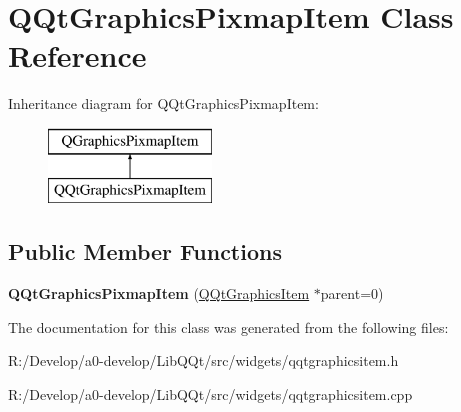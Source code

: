 \hypertarget{class_q_qt_graphics_pixmap_item}{}\section{Q\+Qt\+Graphics\+Pixmap\+Item Class Reference}
\label{class_q_qt_graphics_pixmap_item}
Inheritance diagram for Q\+Qt\+Graphics\+Pixmap\+Item\+:\begin{figure}[H]
\begin{center}
\leavevmode
\includegraphics[height=2.000000cm]{class_q_qt_graphics_pixmap_item}
\end{center}
\end{figure}
\subsection*{Public Member Functions}
\begin{DoxyCompactItemize}
\item 
\mbox{\label{class_q_qt_graphics_pixmap_item_a9958e7e3d2a49759b08baa8a60475c6e}} 
{\bfseries Q\+Qt\+Graphics\+Pixmap\+Item} (\mbox{\hyperlink{class_q_qt_graphics_item}{Q\+Qt\+Graphics\+Item}} $\ast$parent=0)
\end{DoxyCompactItemize}


The documentation for this class was generated from the following files\+:\begin{DoxyCompactItemize}
\item 
R\+:/\+Develop/a0-\/develop/\+Lib\+Q\+Qt/src/widgets/qqtgraphicsitem.\+h\item 
R\+:/\+Develop/a0-\/develop/\+Lib\+Q\+Qt/src/widgets/qqtgraphicsitem.\+cpp\end{DoxyCompactItemize}
